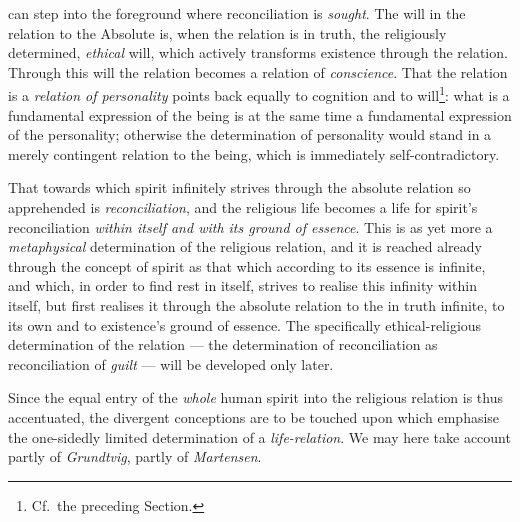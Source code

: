 \documentclass[12pt,a4paper]{book}
\begin{document}
\setcounter{footnote}{0}%
can step into the foreground where reconciliation is \emph{sought}. The will
in the relation to the Absolute is, when the relation is in truth, the
religiously determined, \emph{ethical} will, which actively transforms
existence through the relation. Through this will the relation becomes a
relation of \emph{conscience}. That the relation is a \emph{relation of
personality} points back equally to cognition and to will\footnote{Cf.\ the
preceding Section.}: what is a fundamental expression of the being is at the
same time a fundamental expression of the personality; otherwise the
determination of personality would stand in a merely contingent relation to
the being, which is immediately self-contradictory.

That towards which spirit infinitely strives through the absolute relation so
apprehended is \emph{reconciliation}, and the religious life becomes a life
for spirit's reconciliation \emph{within itself and with its ground of
essence}. This is as yet more a \emph{metaphysical} determination of the
religious relation, and it is reached already through the concept of spirit as
that which according to its essence is infinite, and which, in order to find
rest in itself, strives to realise this infinity within itself, but first
realises it through the absolute relation to the in truth infinite, to its own
and to existence's ground of essence. The specifically ethical-religious
determination of the relation --- the determination of reconciliation as
reconciliation of \emph{guilt} --- will be developed only later.

Since the equal entry of the \emph{whole} human spirit into the religious
relation is thus accentuated, the divergent conceptions are to be touched upon
which emphasise the one-sidedly limited determination of a \emph{life-relation}.
We may here take account partly of \emph{Grundtvig}, partly of
\emph{Martensen}.
\end{document}
